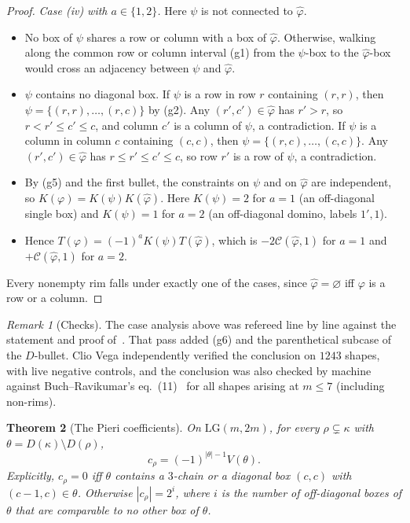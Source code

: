 \documentclass[11pt]{amsart}
\newtheorem{theorem}{Theorem}[section]
\theoremstyle{definition}
\theoremstyle{remark}
\newtheorem{remark}[theorem]{Remark}
\newcommand{\LG}{\mathrm{LG}}
\newcommand{\cC}{\mathcal{C}}
\begin{document}
\begin{proof}
\emph{Case (iv) with $a\in\{1,2\}$.} Here $\psi$ is not connected to $\hat\varphi$.
\begin{itemize}
\item No box of $\psi$ shares a row or column with a box of $\hat\varphi$. Otherwise, walking
along the common row or column interval (g1) from the $\psi$-box to the $\hat\varphi$-box would
cross an adjacency between $\psi$ and $\hat\varphi$.
\item $\psi$ contains no diagonal box. If $\psi$ is a row in row $r$ containing $(r,r)$, then
$\psi=\{(r,r),\dots,(r,c)\}$ by (g2). Any $(r',c')\in\hat\varphi$ has $r'>r$, so
$r<r'\le c'\le c$, and column $c'$ is a column of $\psi$, a contradiction. If $\psi$ is a column
in column $c$ containing $(c,c)$, then $\psi=\{(r,c),\dots,(c,c)\}$. Any
$(r',c')\in\hat\varphi$ has $r\le r'\le c'\le c$, so row $r'$ is a row of $\psi$, a
contradiction.
\item By (g5) and the first bullet, the constraints on $\psi$ and on $\hat\varphi$ are
independent, so $K(\varphi)=K(\psi)K(\hat\varphi)$. Here $K(\psi)=2$ for $a=1$ (an off-diagonal
single box) and $K(\psi)=1$ for $a=2$ (an off-diagonal domino, labels $1',1$).
\item Hence $T(\varphi)=(-1)^aK(\psi)T(\hat\varphi)$, which is $-2\cC(\hat\varphi,1)$ for
$a=1$ and $+\cC(\hat\varphi,1)$ for $a=2$.
\end{itemize}
Every nonempty rim falls under exactly one of the cases, since $\hat\varphi=\varnothing$ iff
$\varphi$ is a row or a column.
\end{proof}

\begin{remark}[Checks]
The case analysis above was refereed line by line against the statement and proof
of~\cite[Thm.~5.5]{BR12}. That pass added (g6) and the parenthetical subcase of the $D$-bullet.
Clio Vega independently verified the conclusion on $1243$ shapes, with live negative controls,
and the conclusion was also checked by machine against Buch--Ravikumar's
eq.~(11)~\cite{BR12} for all shapes arising at $m\le7$ (including non-rims).
\end{remark}

\begin{theorem}[The Pieri coefficients]\label{thm:Q30}
On $\LG(m,2m)$, for every $\rho\subsetneq\kappa$ with $\theta=D(\kappa)\setminus D(\rho)$,
\[ c_\rho=(-1)^{|\theta|-1}V(\theta). \]
Explicitly, $c_\rho=0$ iff $\theta$ contains a $3$-chain or a diagonal box $(c,c)$ with
$(c-1,c)\in\theta$. Otherwise $|c_\rho|=2^i$, where $i$ is the number of off-diagonal boxes of
$\theta$ that are comparable to no other box of $\theta$.
\end{theorem}
\end{document}
